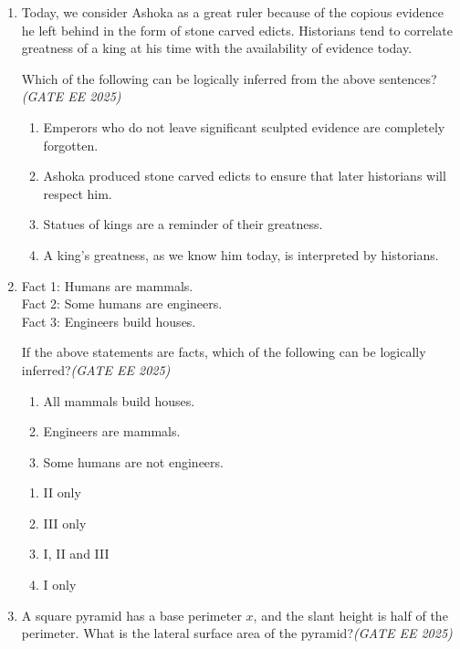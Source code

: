 \begin{enumerate}[leftmargin=*,label=\textbf{Q.\arabic*},resume]
\item Today, we consider Ashoka as a great ruler because of the copious evidence he left behind in the form of stone carved edicts. Historians tend to correlate greatness of a king at his time with the availability of evidence today.

Which of the following can be logically inferred from the above sentences?\hfill \textit{(GATE EE 2025)}
\begin{enumerate}[label=(\Alph*)]
\item Emperors who do not leave significant sculpted evidence are completely forgotten.
\item Ashoka produced stone carved edicts to ensure that later historians will respect him.
\item Statues of kings are a reminder of their greatness.
\item A king’s greatness, as we know him today, is interpreted by historians.
\end{enumerate}

\item Fact 1: Humans are mammals.\\ 
Fact 2: Some humans are engineers.\\ 
Fact 3: Engineers build houses.

If the above statements are facts, which of the following can be logically inferred?\hfill \textit{(GATE EE 2025)}

\begin{enumerate}[label=\roman*.]
\item All mammals build houses.
\item Engineers are mammals.
\item Some humans are not engineers.
\end{enumerate}

\begin{multicols}{2}
\begin{enumerate}[label=(\Alph*)]
\item II only
\item III only
\item I, II and III
\item I only
\end{enumerate}
\end{multicols}

\item A square pyramid has a base perimeter $x$, and the slant height is half of the perimeter. What is the lateral surface area of the pyramid?\hfill \textit{(GATE EE 2025)}


\end{enumerate}

